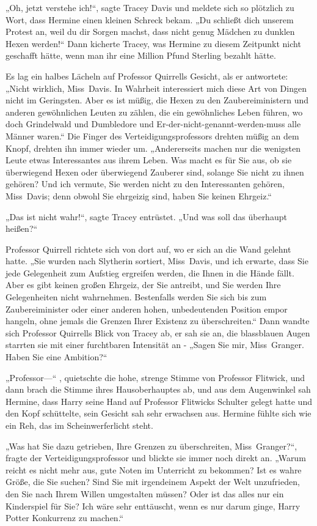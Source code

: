 {„Oh, jetzt verstehe ich!“, sagte Tracey Davis und meldete sich so plötzlich zu Wort, dass Hermine einen kleinen Schreck bekam. „Du schließt dich unserem Protest an, weil du dir Sorgen machst, dass nicht genug Mädchen zu dunklen Hexen werden!“ Dann kicherte Tracey, was Hermine zu diesem Zeitpunkt nicht geschafft hätte, wenn man ihr eine Million Pfund Sterling bezahlt hätte.

Es lag ein halbes Lächeln auf Professor Quirrells Gesicht, als er antwortete: „Nicht wirklich, Miss~Davis. In Wahrheit interessiert mich diese Art von Dingen nicht im Geringsten. Aber es ist müßig, die Hexen zu den Zaubereiministern und anderen gewöhnlichen Leuten zu zählen, die ein gewöhnliches Leben führen, wo doch Grindelwald und Dumbledore und Er-der-nicht-genannt-werden-muss alle Männer waren.“ Die Finger des Verteidigungsprofessors drehten müßig an dem Knopf, drehten ihn immer wieder um. „Andererseits machen nur die wenigsten Leute etwas Interessantes aus ihrem Leben. Was macht es für Sie aus, ob sie überwiegend Hexen oder überwiegend Zauberer sind, solange Sie nicht zu ihnen gehören? Und ich vermute, Sie werden nicht zu den Interessanten gehören, Miss~Davis; denn obwohl Sie ehrgeizig sind, haben Sie keinen Ehrgeiz.“

„Das ist nicht wahr!“, sagte Tracey entrüstet. „Und was soll das überhaupt heißen?“

Professor Quirrell richtete sich von dort auf, wo er sich an die Wand gelehnt hatte. „Sie wurden nach Slytherin sortiert, Miss~Davis, und ich erwarte, dass Sie jede Gelegenheit zum Aufstieg ergreifen werden, die Ihnen in die Hände fällt. Aber es gibt keinen großen Ehrgeiz, der Sie antreibt, und Sie werden Ihre Gelegenheiten nicht wahrnehmen. Bestenfalls werden Sie sich bis zum Zaubereiminister oder einer anderen hohen, unbedeutenden Position empor hangeln, ohne jemals die Grenzen Ihrer Existenz zu überschreiten.“ Dann wandte sich Professor Quirrells Blick von Tracey ab, er sah sie an, die blassblauen Augen starrten sie mit einer furchtbaren Intensität an - „Sagen Sie mir, Miss~Granger. Haben Sie eine Ambition?“

„Professor—“ , quietschte die hohe, strenge Stimme von Professor Flitwick, und dann brach die Stimme ihres Hausoberhauptes ab, und aus dem Augenwinkel sah Hermine, dass Harry seine Hand auf Professor Flitwicks Schulter gelegt hatte und den Kopf schüttelte, sein Gesicht sah sehr erwachsen aus. Hermine fühlte sich wie ein Reh, das im Scheinwerferlicht steht.

„Was hat Sie dazu getrieben, Ihre Grenzen zu überschreiten, Miss~Granger?“, fragte der Verteidigungsprofessor und blickte sie immer noch direkt an. „Warum reicht es nicht mehr aus, gute Noten im Unterricht zu bekommen? Ist es wahre Größe, die Sie suchen? Sind Sie mit irgendeinem Aspekt der Welt unzufrieden, den Sie nach Ihrem Willen umgestalten müssen? Oder ist das alles nur ein Kinderspiel für Sie? Ich wäre sehr enttäuscht, wenn es nur darum ginge, Harry Potter Konkurrenz zu machen.“

}

